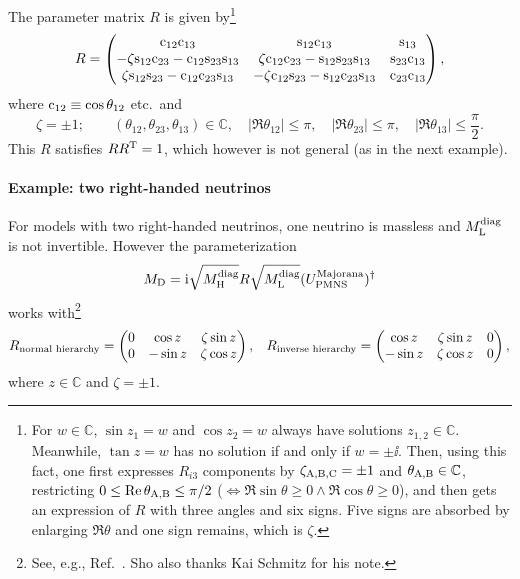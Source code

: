 \documentclass[CheatSheet]{subfiles}
\newcommand\MD[1][]{M_{\mathrm{D}#1}}
\begin{document}
The parameter matrix $R$ is given by\footnote{For $w\in\mathbb C$, $\sin z_1=w$ and $\cos z_2=w$ always have solutions $z_{1,2}\in\mathbb C$. Meanwhile, $\tan z=w$ has no solution if and only if $w=\pm \ii$. Then, using this fact, one first expresses $R_{i3}$ components by $\zeta_{\mathrm{A,B,C}}=\pm1$ and $\theta_{\mathrm{A,B}}\in\mathbb C$, restricting $0\le\mathop{\mathrm{Re}}\theta_{\mathrm{A,B}}\le\pi/2$ ($\Leftrightarrow\Re{\sin{\theta}}\ge0\land\Re\cos\theta\ge0$), and then gets an expression of $R$ with three angles and six signs. Five signs are absorbed by enlarging $\Re\theta$ and one sign remains, which is $\zeta$.}
\begin{equation}
 R=\begin{pmatrix}
 \mathrm{c}_{12} \mathrm{c}_{13} & \mathrm{s}_{12} \mathrm{c}_{13} & \mathrm{s}_{13} \\
 -\zeta \mathrm{s}_{12} \mathrm{c}_{23}-\mathrm{c}_{12} \mathrm{s}_{23} \mathrm{s}_{13} & \zeta \mathrm{c}_{12} \mathrm{c}_{23} -\mathrm{s}_{12} \mathrm{s}_{23} \mathrm{s}_{13} & \mathrm{s}_{23} \mathrm{c}_{13} \\
  \zeta \mathrm{s}_{12} \mathrm{s}_{23}-\mathrm{c}_{12} \mathrm{c}_{23} \mathrm{s}_{13} & -\zeta\mathrm{c}_{12} \mathrm{s}_{23} -\mathrm{s}_{12} \mathrm{c}_{23} \mathrm{s}_{13} & \mathrm{c}_{23} \mathrm{c}_{13}
\end{pmatrix},
\end{equation}
where $\mathrm{c}_{12}\equiv \cos{\theta_{12}}$ etc.\ and
\begin{equation}
 \zeta=\pm1; \qquad
(\theta_{12},\theta_{23},\theta_{13})\in\mathbb C,\quad
|\Re\theta_{12}|\le\pi, \quad |\Re\theta_{23}|\le\pi,  \quad |\Re\theta_{13}|\le\frac{\pi}{2}.
\end{equation}
This $R$ satisfies $RR^{\mathrm{T}}=1$, which however is not general (as in the next example).

\paragraph{Example: two right-handed neutrinos}
For models with two right-handed neutrinos, one neutrino is massless and $M_{\mathrm{L}}^{\text{diag}}$ is not invertible. However the parameterization
\begin{equation}
 \MD = \ii \sqrt{M\w H^\text{diag}}R\sqrt{M\w L^\text{diag}}(U^{\text{Majorana}}\w{PMNS} )^\dagger
\end{equation}
works with\footnote{See, e.g., Ref.~\cite{Brdar:2019iem}. Sho also thanks Kai Schmitz for his note.}
\begin{align}
 R_{\text{normal hierarchy}}&=\begin{pmatrix}0 & \cos z & \zeta\sin z \\ 0 & -\sin z & \zeta \cos z\end{pmatrix},&
 R_{\text{inverse hierarchy}}=\begin{pmatrix}\cos z & \zeta\sin z &0 \\ -\sin z & \zeta \cos z & 0\end{pmatrix},
\end{align}
where $z\in\mathbb C$ and $\zeta=\pm1$.
\end{document}
